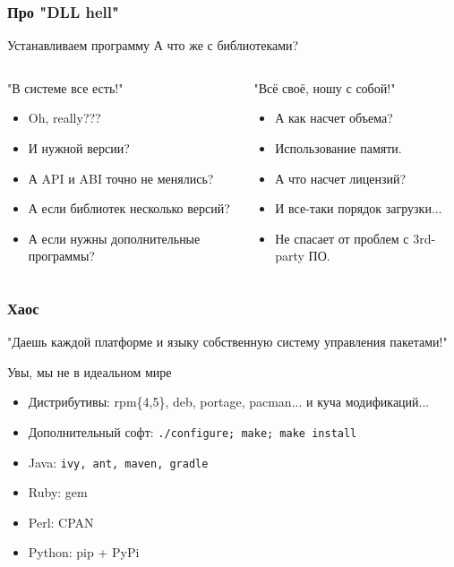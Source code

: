 \begin{frame}
	\frametitle{Про "DLL hell"}
	
	\begin{block}{Устанавливаем программу}
	А что же с библиотеками?
	\end{block}

	\pause

	\begin{columns}
		\begin{block}{"В системе все есть!"}
		\begin{itemize}
			\item Oh, really???
			\item И нужной версии?
			\item А API и ABI точно не менялись?
			\item А если библиотек несколько версий?
			\item А если нужны дополнительные программы?
		\end{itemize}
		\end{block}
		\pause
		\begin{block}{"Всё своё, ношу с собой!"}
		\begin{itemize}
			\item А как насчет объема?
			\item Использование памяти.
			\item А что насчет лицензий?
			\item И все-таки порядок загрузки...
			\item Не спасает от проблем с 3rd-party ПО.
		\end{itemize}
		\end{block}
	\end{columns}
\end{frame}

\begin{frame}
	\frametitle{Хаос}

	\begin{center}
		"Даешь каждой платформе и языку собственную систему управления пакетами!"
	\end{center}

	\begin{block}{Увы, мы не в идеальном мире}
		\begin{itemize}
			\item Дистрибутивы: rpm\{4,5\}, deb, portage, pacman... и куча модификаций...
			\item Дополнительный софт: {\tt ./configure; make; make install}
			\item Java: {\tt ivy, ant, maven, gradle}
			\item Ruby: gem
			\item Perl: CPAN
			\item Python: pip + PyPi
		\end{itemize}
	\end{block}

\end{frame}

